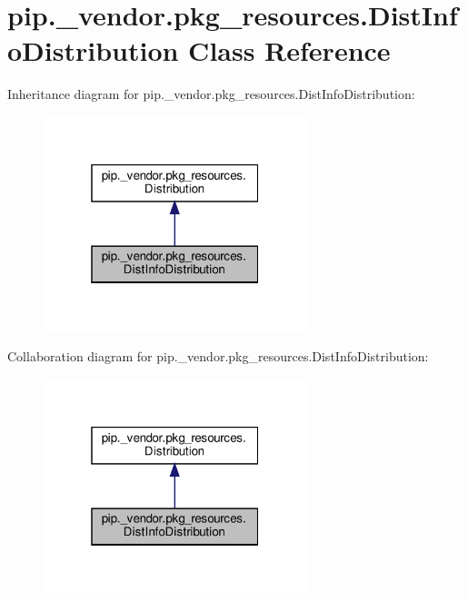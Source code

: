 \hypertarget{classpip_1_1__vendor_1_1pkg__resources_1_1DistInfoDistribution}{}\section{pip.\+\_\+vendor.\+pkg\+\_\+resources.\+Dist\+Info\+Distribution Class Reference}
\label{classpip_1_1__vendor_1_1pkg__resources_1_1DistInfoDistribution}


Inheritance diagram for pip.\+\_\+vendor.\+pkg\+\_\+resources.\+Dist\+Info\+Distribution\+:
\nopagebreak
\begin{figure}[H]
\begin{center}
\leavevmode
\includegraphics[width=217pt]{classpip_1_1__vendor_1_1pkg__resources_1_1DistInfoDistribution__inherit__graph}
\end{center}
\end{figure}


Collaboration diagram for pip.\+\_\+vendor.\+pkg\+\_\+resources.\+Dist\+Info\+Distribution\+:
\nopagebreak
\begin{figure}[H]
\begin{center}
\leavevmode
\includegraphics[width=217pt]{classpip_1_1__vendor_1_1pkg__resources_1_1DistInfoDistribution__coll__graph}
\end{center}
\end{figure}
